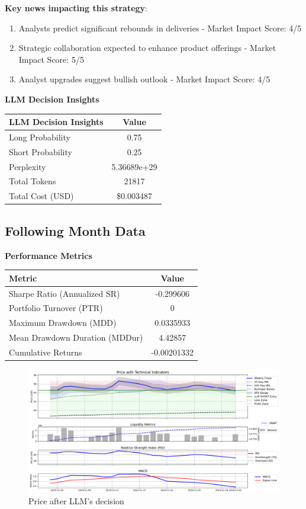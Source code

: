 \documentclass[8pt]{scrartcl}
\begin{document}
\textbf{Key news impacting this strategy}:
\begin{enumerate}
    \item Analysts predict significant rebounds in deliveries - Market Impact Score: 4/5
    \item Strategic collaboration expected to enhance product offerings - Market Impact Score: 5/5
    \item Analyst upgrades suggest bullish outlook - Market Impact Score: 4/5
\end{enumerate}

\textbf{LLM Decision Insights}

\begin{longtable}{l c}
\toprule
\textbf{LLM Decision Insights} & \textbf{Value} \\
\midrule
Long Probability & 0.75 \\
Short Probability & 0.25 \\
Perplexity & 5.36689e+29 \\
\midrule
Total Tokens & 21817 \\
Total Cost (USD) & \$0.003487 \\
\bottomrule
\end{longtable}

\subsection*{Following Month Data}

\textbf{Performance Metrics}

\begin{longtable}{l c}
\toprule
\textbf{Metric} & \textbf{Value} \\
\midrule
Sharpe Ratio (Annualized SR) & -0.299606 \\
Portfolio Turnover (PTR) & 0 \\
Maximum Drawdown (MDD) & 0.0335933 \\
Mean Drawdown Duration (MDDur) & 4.42857 \\
Cumulative Returns & -0.00201332 \\
\bottomrule
\end{longtable}

\begin{figure}[H]
    \centering
    \includegraphics[width=1\linewidth]{judge_reviews//GOOGL_M_gpt-4o-mini//2019-11-01/llm_Price_with_Technical_Indicators.png}
    \caption{Price after LLM's decision}
\end{figure}
\end{document}
